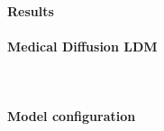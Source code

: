 

\paragraph{Results}

\newpage
\paragraph{Medical Diffusion LDM}\mbox{}\\



\paragraph{Model configuration}

